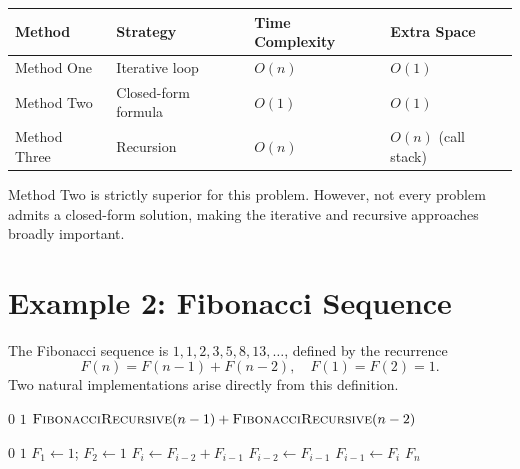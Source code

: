 \documentclass[11pt, a4paper, notitlepage]{report}
\theoremstyle{definition}
\theoremstyle{remark}
\theoremstyle{definition}
\begin{document}
\begin{keyresult}[title={Comparing the Three Methods}]
\begin{center}
\begin{tabular}{@{}llll@{}}
\toprule
\textbf{Method} & \textbf{Strategy} & \textbf{Time Complexity} & \textbf{Extra Space} \\
\midrule
Method One  & Iterative loop       & $O(n)$    & $O(1)$ \\
Method Two  & Closed-form formula  & $O(1)$    & $O(1)$ \\
Method Three & Recursion           & $O(n)$    & $O(n)$ (call stack) \\
\bottomrule
\end{tabular}
\end{center}
Method Two is strictly superior for this problem. However, not every problem admits a
closed-form solution, making the iterative and recursive approaches broadly important.
\end{keyresult}

\section{Example 2: Fibonacci Sequence}
\label{sec:fibonacci}

The Fibonacci sequence is $1, 1, 2, 3, 5, 8, 13, \ldots$, defined by the recurrence
\[
  F(n) = F(n-1) + F(n-2), \quad F(1) = F(2) = 1.
\]
Two natural implementations arise directly from this definition.

\begin{algorithm}[H]
\caption{Fibonacci: Recursive}
\label{alg:fib-recursive}
\begin{algorithmic}[1]
      \State \Return $0$
    \EndIf
      \State \Return $1$
    \EndIf
    \State \Return $\Call{FibonacciRecursive}{n-1} + \Call{FibonacciRecursive}{n-2}$
  \EndFunction
\end{algorithmic}
\end{algorithm}

\begin{algorithm}[H]
\caption{Fibonacci: Iterative}
\label{alg:fib-iterative}
\begin{algorithmic}[1]
     \State \Return $0$ \EndIf
     \State \Return $1$ \EndIf
    \State $F_1 \gets 1$; \quad $F_2 \gets 1$
      \State $F_i \gets F_{i-2} + F_{i-1}$
      \State $F_{i-2} \gets F_{i-1}$
      \State $F_{i-1} \gets F_i$
    \EndFor
    \State \Return $F_n$
  \EndFunction
\end{algorithmic}
\end{algorithm}
\end{document}
